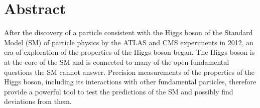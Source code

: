 \chapter*{Abstract}
After the discovery of a particle consistent with the Higgs boson of the Standard Model (SM) of particle physics by the ATLAS and CMS experiments in 2012, an era of exploration of the properties of the Higgs boson began.
The Higgs boson is at the core of the SM and is connected to many of the open fundamental questions the SM cannot answer.
Precision measurements of the properties of the Higgs boson, including its interactions with other fundamental particles, therefore provide a powerful tool to test the predictions of the SM and possibly find deviations from them.
